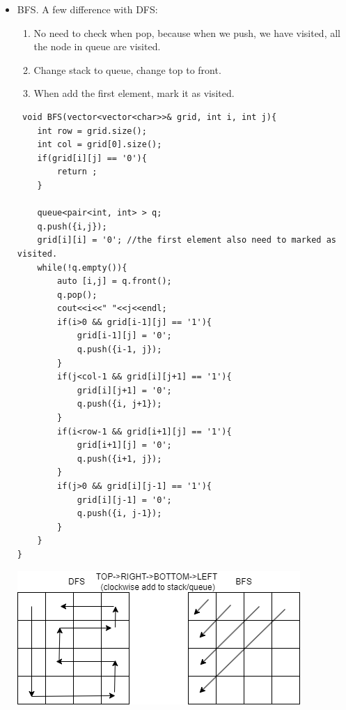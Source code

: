 \documentclass[a4paper,11pt,twoside]{book}
\begin{document}
\begin{itemize}
	\item BFS. A few difference with DFS:
\begin{enumerate}
	\item No need to check when pop, because when we push, we have visited, all the node in queue are visited. 
	
	\item Change stack to queue, change top to front.
	
	\item When add the first element, mark it as visited.  
\end{enumerate}
	 
\begin{lstlisting}
 void BFS(vector<vector<char>>& grid, int i, int j){
	int row = grid.size();
	int col = grid[0].size();
	if(grid[i][j] == '0'){
		return ;
	}
	
	queue<pair<int, int> > q;
	q.push({i,j});
	grid[i][i] = '0'; //the first element also need to marked as visited. 
	while(!q.empty()){
		auto [i,j] = q.front();
		q.pop();
		cout<<i<<" "<<j<<endl;
		if(i>0 && grid[i-1][j] == '1'){
			grid[i-1][j] = '0';
			q.push({i-1, j});
		}
		if(j<col-1 && grid[i][j+1] == '1'){
			grid[i][j+1] = '0';
			q.push({i, j+1});
		}
		if(i<row-1 && grid[i+1][j] == '1'){
			grid[i+1][j] = '0';
			q.push({i+1, j});
		}
		if(j>0 && grid[i][j-1] == '1'){
			grid[i][j-1] = '0';
			q.push({i, j-1});
		}      
	}
}
\end{lstlisting}

\begin{center}
	\includegraphics[scale=0.70]{pics/dfs_bfs.drawio.png}
\end{center}

\end{itemize}	
\end{document}
